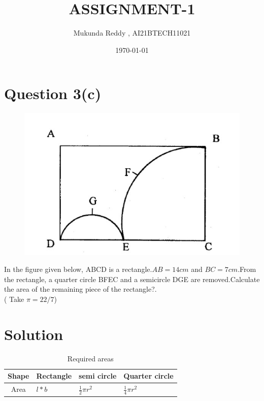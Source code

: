 \documentclass[11pt,a4paper]{article}
\begin{document}
\title{ASSIGNMENT-1}
\author{Mukunda Reddy , AI21BTECH11021}
\date{\today}
\maketitle
\begin{multicols}{2}
\section*{\large Question 3(c)}
\begin{figure}[H]
    \centering
    \includegraphics[scale = 0.5]{Figure_1.jpg}
\end{figure}

In the figure given below, ABCD is a rectangle.${AB = 14cm}$ and
${BC= 7 cm}$.From the rectangle, a quarter circle BFEC and a
semicircle DGE are removed.Calculate the area of the remaining
piece of the rectangle?.\\
( Take $ \pi = 22/7 $)\\
\hline
\section*{\Large{Solution\:}}

\begin{table}[H]
    \centering
    \renewcommand{\arraystretch}{1.5}
    \begin{tabular}{|c|p{1.5cm}|p{1.2cm}|p{1.2cm}|}
    \hline
    Shape & Rectangle & semi circle & Quarter circle\\ \hline
    Area &$l*b$ & $\frac{1}{2}\pi r^2$ & $\frac{1}{4}\pi r^2$\\
    \hline
    \end{tabular}
    \caption{Required areas}
\end{table}


\end{multicols}
\end{document}

